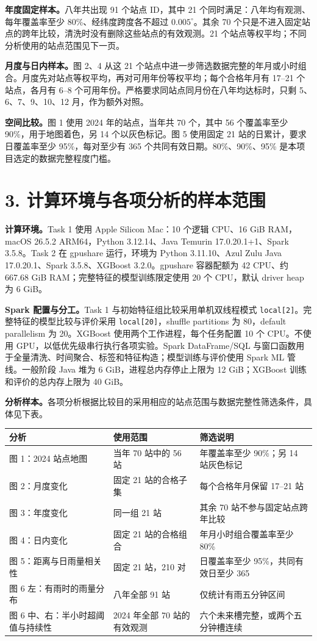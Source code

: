 \documentclass[UTF8,fontset=fandol,10pt,a4paper,landscape]{ctexart}
\begin{document}
\textbf{年度固定样本。}八年共出现 91 个站点 ID，其中 21 个同时满足：八年均有观测、每年覆盖率至少 80\%、经纬度跨度各不超过 $0.005^\circ$。其余 70 个只是不进入固定站点的跨年比较，清洗时没有删除这些站点的有效观测。21 个站点等权平均；不同分析使用的站点范围见下一页。

\textbf{月度与日内样本。}图 2、4 从这 21 个站点中进一步筛选数据完整的年月或小时组合。月度先对站点等权平均，再对可用年份等权平均；每个合格年月有 17--21 个站点，各月有 6--8 个可用年份。严格要求同站点同月份在八年均达标时，只剩 5、6、7、9、10、12 月，作为额外对照。

\textbf{空间比较。}图 1 使用 2024 年的站点，当年共 70 个，其中 56 个覆盖率至少 90\%，用于地图着色，另 14 个以灰色标记。图 5 使用固定 21 站的日累计，要求日覆盖率至少 95\%，每对至少有 365 个共同有效日期。80\%、90\%、95\% 是本项目选定的数据完整程度门槛。

\clearpage\section*{3. 计算环境与各项分析的样本范围}

\textbf{计算环境。}Task 1 使用 Apple Silicon Mac：10 个逻辑 CPU、16 GiB RAM，macOS 26.5.2 ARM64，Python 3.12.14、Java Temurin 17.0.20.1+1、Spark 3.5.8。Task 2 在 gpushare 运行，环境为 Python 3.11.10、Azul Zulu Java 17.0.20.1、Spark 3.5.8、XGBoost 3.2.0。gpushare 容器配额为 42 CPU、约 667.68 GiB RAM；完整特征的模型训练限定使用 20 个 CPU，默认 driver heap 为 6 GiB。

\textbf{Spark 配置与分工。}Task 1 与初始特征组比较采用单机双线程模式 \texttt{local[2]}。完整特征的模型比较与评价采用 \texttt{local[20]}，shuffle partitions 为 80，default parallelism 为 20。XGBoost 使用两个工作进程，每个任务配置 10 个 CPU。不使用 GPU，以低优先级串行执行各项实验。Spark DataFrame/SQL 与窗口函数用于全量清洗、时间聚合、标签和特征构造；模型训练与评价使用 Spark ML 管线。一般阶段 Java 堆为 6 GiB，进程总内存停止上限为 12 GiB；XGBoost 训练和评价的总内存上限为 40 GiB。

\textbf{分析样本。}各项分析根据比较目的采用相应的站点范围与数据完整性筛选条件，具体见下表。
\begin{center}\begin{tabular}{lll}
\toprule
分析 & 使用范围 & 筛选说明\\\midrule
图 1：2024 站点地图 & 当年 70 站中的 56 站 & 年覆盖率至少 90\%；另 14 站灰色标记\\
图 2：月度变化 & 固定 21 站的合格子集 & 每个合格年月保留 17--21 站\\
图 3：年度变化 & 同一组 21 站 & 其余 70 站不参与固定站点跨年比较\\
图 4：日内变化 & 固定 21 站的合格组合 & 年月小时组合覆盖率至少 80\%\\
图 5：距离与日雨量相关性 & 固定 21 站，210 对 & 日覆盖率至少 95\%，共同有效日至少 365\\
图 6 左：有雨时的雨量分布 & 八年全部 91 站 & 仅统计有雨五分钟区间\\
图 6 中、右：半小时超阈值与持续性 & 2024 年全部 70 站的有效观测 & 六个未来槽完整，或两个五分钟槽连续\\
\bottomrule\end{tabular}\end{center}
\end{document}
